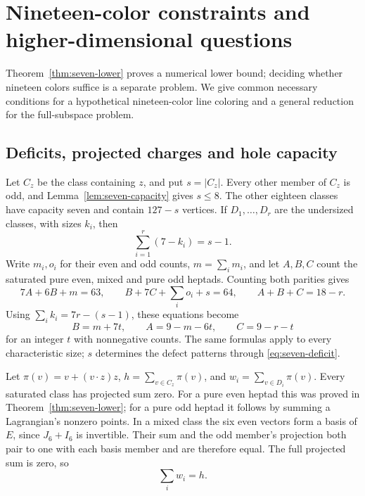 \section{Nineteen-color constraints and higher-dimensional questions}
\label{sec:higher}

Theorem~\ref{thm:seven-lower} proves a numerical lower bound;
deciding whether nineteen colors suffice is a separate problem.
We give common necessary conditions for a hypothetical
nineteen-color line coloring and a general reduction for the
full-subspace problem.

\subsection{Deficits, projected charges and hole capacity}

Let $C_z$ be the class containing $z$, and put $s=|C_z|$.
Every other member of $C_z$ is odd, and Lemma~\ref{lem:seven-capacity}
gives $s\leq8$. The other eighteen classes have capacity seven
and contain $127-s$ vertices. If $D_1,\ldots,D_r$ are the
undersized classes, with sizes $k_i$, then
\begin{equation}\label{eq:seven-deficit}
\sum_{i=1}^r(7-k_i)=s-1.
\end{equation}
Write $m_i,o_i$ for their even and odd counts, $m=\sum_i m_i$,
and let $A,B,C$ count the saturated pure even, mixed and pure
odd heptads. Counting both parities gives
\[
7A+6B+m=63,\qquad
B+7C+\sum_i o_i+s=64,\qquad A+B+C=18-r.
\]
Using $\sum_i k_i=7r-(s-1)$, these equations become
\begin{equation}\label{eq:seven-counts}
B=m+7t,\qquad A=9-m-6t,\qquad C=9-r-t
\end{equation}
for an integer $t$ with nonnegative counts. The same formulas
apply to every characteristic size; $s$ determines the defect
patterns through \eqref{eq:seven-deficit}.

Let $\pi(v)=v+(v\cdot z)z$, $h=\sum_{v\in C_z}\pi(v)$, and
$w_i=\sum_{v\in D_i}\pi(v)$. Every saturated class has projected
sum zero. For a pure even heptad this was proved in
Theorem~\ref{thm:seven-lower}; for a pure odd heptad it follows
by summing a Lagrangian's nonzero points. In a mixed class the
six even vectors form a basis of $E$, since $J_6+I_6$ is invertible.
Their sum and the odd member's projection both pair to one with
each basis member and are therefore equal. The full projected
sum is zero, so
\begin{equation}\label{eq:seven-charge}
\sum_i w_i=h.
\end{equation}

